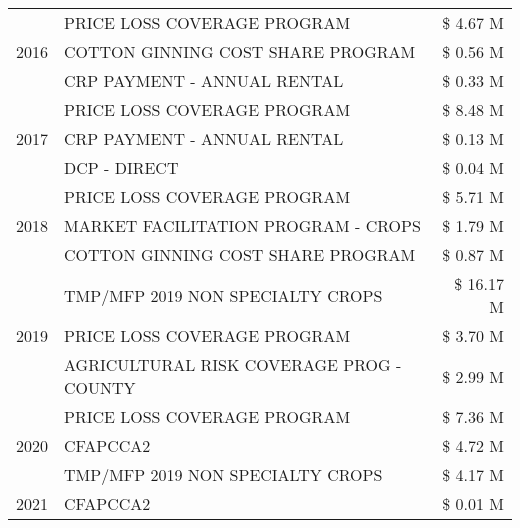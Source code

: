 \begin{tabular}{llr}
\cline{1-3}
\multirow[t]{3}{*}{2016} & PRICE LOSS COVERAGE PROGRAM & \$ 4.67 M \\
 & COTTON GINNING COST SHARE PROGRAM & \$ 0.56 M \\
 & CRP PAYMENT - ANNUAL RENTAL & \$ 0.33 M \\
\cline{1-3}
\multirow[t]{3}{*}{2017} & PRICE LOSS COVERAGE PROGRAM & \$ 8.48 M \\
 & CRP PAYMENT - ANNUAL RENTAL & \$ 0.13 M \\
 & DCP - DIRECT & \$ 0.04 M \\
\cline{1-3}
\multirow[t]{3}{*}{2018} & PRICE LOSS COVERAGE PROGRAM & \$ 5.71 M \\
 & MARKET FACILITATION PROGRAM - CROPS & \$ 1.79 M \\
 & COTTON GINNING COST SHARE PROGRAM & \$ 0.87 M \\
\cline{1-3}
\multirow[t]{3}{*}{2019} & TMP/MFP 2019 NON SPECIALTY CROPS & \$ 16.17 M \\
 & PRICE LOSS COVERAGE PROGRAM & \$ 3.70 M \\
 & AGRICULTURAL RISK COVERAGE PROG - COUNTY & \$ 2.99 M \\
\cline{1-3}
\multirow[t]{3}{*}{2020} & PRICE LOSS COVERAGE PROGRAM & \$ 7.36 M \\
 & CFAPCCA2 & \$ 4.72 M \\
 & TMP/MFP 2019 NON SPECIALTY CROPS & \$ 4.17 M \\
\cline{1-3}
2021 & CFAPCCA2 & \$ 0.01 M \\
\cline{1-3}
\bottomrule
\end{tabular}
